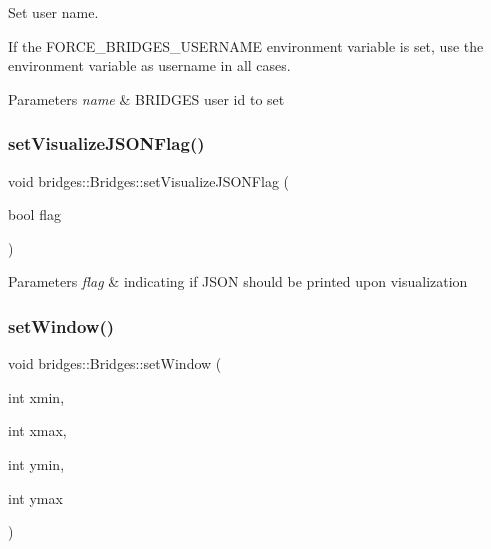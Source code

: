 Set user name. 

If the F\+O\+R\+C\+E\+\_\+\+B\+R\+I\+D\+G\+E\+S\+\_\+\+U\+S\+E\+R\+N\+A\+ME environment variable is set, use the environment variable as username in all cases.


\begin{DoxyParams}{Parameters}
{\em name} & B\+R\+I\+D\+G\+ES user id to set \\
\hline
\end{DoxyParams}
\mbox{\label{classbridges_1_1_bridges_a69aca37ab2729d0345e0549d7baf0423}} 
\subsubsection{\texorpdfstring{set\+Visualize\+J\+S\+O\+N\+Flag()}{setVisualizeJSONFlag()}}
{\footnotesize\ttfamily void bridges\+::\+Bridges\+::set\+Visualize\+J\+S\+O\+N\+Flag (\begin{DoxyParamCaption}\item[{bool}]{flag }\end{DoxyParamCaption})\hspace{0.3cm}{\ttfamily [inline]}}


\begin{DoxyParams}{Parameters}
{\em flag} & indicating if J\+S\+ON should be printed upon visualization \\
\hline
\end{DoxyParams}
\mbox{\label{classbridges_1_1_bridges_a0465bca83056a72ba4db82b60e622163}} 
\subsubsection{\texorpdfstring{set\+Window()}{setWindow()}\hspace{0.1cm}{\footnotesize\ttfamily [1/2]}}
{\footnotesize\ttfamily void bridges\+::\+Bridges\+::set\+Window (\begin{DoxyParamCaption}\item[{int}]{xmin,  }\item[{int}]{xmax,  }\item[{int}]{ymin,  }\item[{int}]{ymax }\end{DoxyParamCaption})\hspace{0.3cm}{\ttfamily [inline]}}

